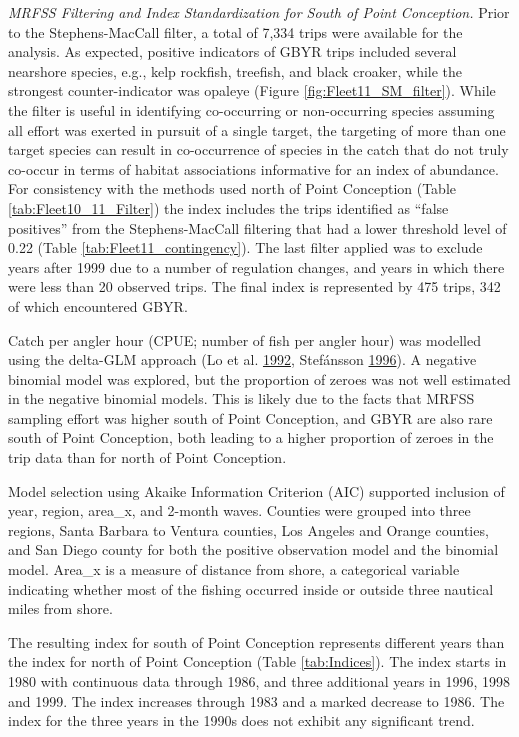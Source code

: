 \documentclass[12pt,]{article}
\begin{document}
\emph{MRFSS Filtering and Index Standardization for South of Point
Conception.} Prior to the Stephens-MacCall filter, a total of 7,334
trips were available for the analysis. As expected, positive indicators
of GBYR trips included several nearshore species, e.g., kelp rockfish,
treefish, and black croaker, while the strongest counter-indicator was
opaleye (Figure \ref{fig:Fleet11_SM_filter}). While the filter is useful
in identifying co-occurring or non-occurring species assuming all effort
was exerted in pursuit of a single target, the targeting of more than
one target species can result in co-occurrence of species in the catch
that do not truly co-occur in terms of habitat associations informative
for an index of abundance. For consistency with the methods used north
of Point Conception (Table \ref{tab:Fleet10_11_Filter}) the index
includes the trips identified as ``false positives'' from the
Stephens-MacCall filtering that had a lower threshold level of 0.22
(Table \ref{tab:Fleet11_contingency}). The last filter applied was to
exclude years after 1999 due to a number of regulation changes, and
years in which there were less than 20 observed trips. The final index
is represented by 475 trips, 342 of which encountered GBYR.

Catch per angler hour (CPUE; number of fish per angler hour) was
modelled using the delta-GLM approach (Lo et al.
\protect\hyperlink{ref-Lo1992}{1992}, Stefánsson
\protect\hyperlink{ref-Stefansson1996}{1996}). A negative binomial model
was explored, but the proportion of zeroes was not well estimated in the
negative binomial models. This is likely due to the facts that MRFSS
sampling effort was higher south of Point Conception, and GBYR are also
rare south of Point Conception, both leading to a higher proportion of
zeroes in the trip data than for north of Point Conception.

Model selection using Akaike Information Criterion (AIC) supported
inclusion of year, region, area\_x, and 2-month waves. Counties were
grouped into three regions, Santa Barbara to Ventura counties, Los
Angeles and Orange counties, and San Diego county for both the positive
observation model and the binomial model. Area\_x is a measure of
distance from shore, a categorical variable indicating whether most of
the fishing occurred inside or outside three nautical miles from shore.

The resulting index for south of Point Conception represents different
years than the index for north of Point Conception (Table
\ref{tab:Indices}). The index starts in 1980 with continuous data
through 1986, and three additional years in 1996, 1998 and 1999. The
index increases through 1983 and a marked decrease to 1986. The index
for the three years in the 1990s does not exhibit any significant trend.
\end{document}
